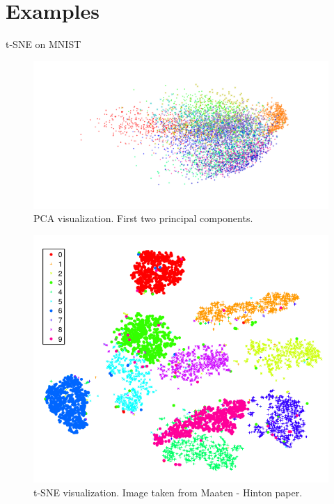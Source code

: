 \documentclass[10pt]{beamer}
\theoremstyle{definition}
\newcommand{\1}{\mathbbm{1}}
\begin{document}
\section{Examples}
\begin{frame}{t-SNE on MNIST}
  \begin{minipage}[h]{0.5\textwidth}
    \begin{figure}[h!]
      \centering
      \includegraphics[scale=0.2,trim=15cm 0 0 0]{./pic/PCA.png}
      \caption{PCA visualization. First two principal components.}
    \end{figure}
  \end{minipage}%
  \hfill
  \begin{minipage}[h]{0.4\textwidth}
    \begin{figure}[h!]
      \centering
      \includegraphics[scale=0.2, trim=0 0 5cm 0]{./pic/MNIST.png}
      \caption{t-SNE visualization. Image taken from Maaten -
      Hinton paper.}
    \end{figure}
  \end{minipage}
\end{frame}
\end{document}
